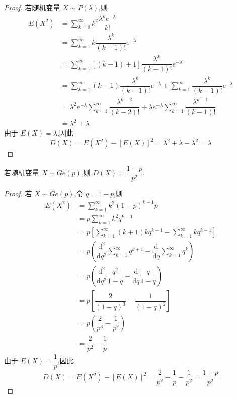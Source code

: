 \begin{proof}
    若随机变量 $X \sim P(\lambda)$,则
    $$
    \begin{aligned}
        E(X^2) &= \sum_{k=0}^{\infty} k^2 \dfrac{\lambda^k e^{-\lambda}}{k!} \\
        &= \sum_{k=1}^{\infty} k \dfrac{\lambda^{k}}{(k-1)!} e^{-\lambda} \\
        &= \sum_{k=1}^{\infty} [(k-1)+1] \dfrac{\lambda^{k}}{(k-1)!} e^{-\lambda} \\
        &= \sum_{k=1}^{\infty} (k-1) \dfrac{\lambda^{k}}{(k-1)!} e^{-\lambda} + \sum_{k=1}^{\infty} \dfrac{\lambda^{k}}{(k-1)!} e^{-\lambda} \\
        &= \lambda^2 e^{-\lambda} \sum_{k=1}^{\infty} \dfrac{\lambda^{k-2}}{(k-2)!} + \lambda e^{-\lambda} \sum_{k=1}^{\infty} \dfrac{\lambda^{k-1}}{(k-1)!} \\
        &= \lambda^2 + \lambda
    \end{aligned}
    $$
    由于 $E(X) = \lambda$,因此
    $$
    D(X) = E(X^2) - [E(X)]^2 = \lambda^2 + \lambda - \lambda^2 = \lambda
    $$
\end{proof}

\begin{conclusion}
    \indent 若随机变量 $X \sim Ge(p)$,则 $D(X) = \dfrac{1-p}{p^2}$.
\end{conclusion}

\begin{proof}
    若 $X \sim Ge(p)$,令 $q=1-p$,则
    $$
    \begin{aligned}
        E(X^2) &= \sum_{k=1}^{\infty} k^2 (1-p)^{k-1} p \\
        &= p \sum_{k=1}^{\infty} k^2 q^{k-1} \\
        &= p \left[ \sum_{k=1}^{\infty} (k+1)k q^{k-1} - \sum_{k=1}^{\infty} k q^{k-1} \right] \\
        &= p \left( \dfrac{\text{d}^2}{\text{d}q^2} \sum_{k=1}^{\infty} q^{k+1} - \dfrac{\text{d}}{\text{d}q} \sum_{k=1}^{\infty} q^k \right) \\
        &= p \left( \dfrac{\text{d}^2}{\text{d}q^2} \dfrac{q^2}{1-q} - \dfrac{\text{d}}{\text{d}q} \dfrac{q}{1-q} \right) \\
        &= p \left[ \dfrac{2}{(1-q)^3} - \dfrac{1}{(1-q)^2} \right] \\
        &= p \left( \dfrac{2}{p^3} - \dfrac{1}{p^2} \right) \\
        &= \dfrac{2}{p^2} - \dfrac{1}{p}
    \end{aligned}
    $$
    由于 $E(X) = \dfrac{1}{p}$,因此
    $$
    D(X) = E(X^2) - [E(X)]^2 = \dfrac{2}{p^2} - \dfrac{1}{p} - \dfrac{1}{p^2} = \dfrac{1-p}{p^2}
    $$
\end{proof}


